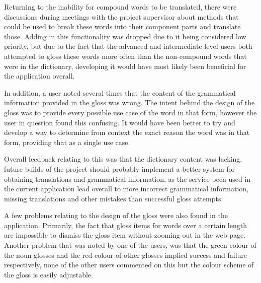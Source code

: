 Returning to the inability for compound words to be translated, there were discussions during meetings with the project supervisor about methods that could be used  to break these words into their component parts and translate those. Adding in this functionality was dropped due to it being considered low priority, but due to the fact that the advanced and intermediate level users both attempted to gloss these words more often than the non-compound words that were in the dictionary, developing it would have most likely been beneficial for the application overall. 

In addition, a user noted several times that the content of the grammatical information provided in the gloss was wrong. The intent behind the design of the gloss was to provide every possible use case of the word in that form, however the user in question found this confusing. It would have been better to try and develop a way to determine from context the exact reason the word was in that form, providing that as a single use case.  

Overall feedback relating to this was that the dictionary content was lacking, future builds of the project should probably implement a better system for obtaining  translations and grammatical information, as the service been used in the current application lead overall to more incorrect grammatical information, missing translations and other mistakes than successful gloss attempts. 

A few problems relating to the design of the gloss were also found in the application. Primarily, the fact that gloss items for words over a certain length are impossible to dismiss the gloss item without zooming out in the web page. Another problem that was noted by one of the users, was that the green colour of the noun glosses and the red colour of other glosses implied success and failure respectively, none of the other users commented on this but the colour scheme of the gloss is easily adjustable.


